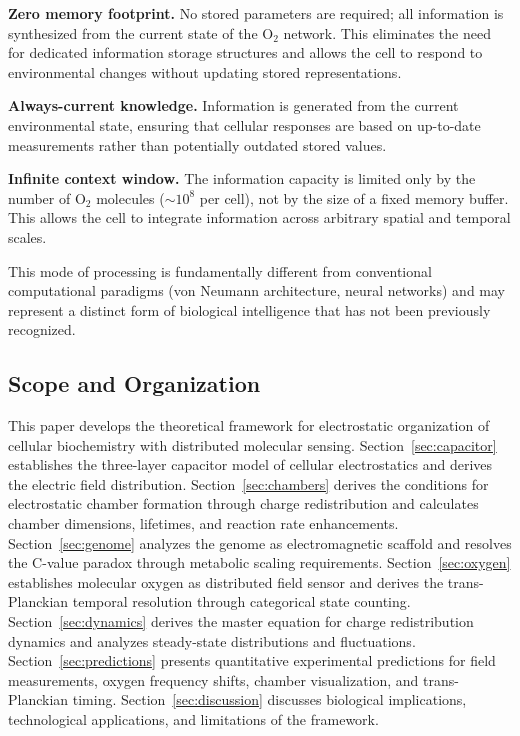 \documentclass[twocolumn,10pt,aps,prd,superscriptaddress,floatfix,nofootinbib]{revtex4-2}
\theoremstyle{remark}
\begin{document}
\textbf{Zero memory footprint.} No stored parameters are required; all information is synthesized from the current state of the O$_2$ network. This eliminates the need for dedicated information storage structures and allows the cell to respond to environmental changes without updating stored representations.

\textbf{Always-current knowledge.} Information is generated from the current environmental state, ensuring that cellular responses are based on up-to-date measurements rather than potentially outdated stored values.

\textbf{Infinite context window.} The information capacity is limited only by the number of O$_2$ molecules ($\sim 10^{8}$ per cell), not by the size of a fixed memory buffer. This allows the cell to integrate information across arbitrary spatial and temporal scales.

This mode of processing is fundamentally different from conventional computational paradigms (von Neumann architecture, neural networks) and may represent a distinct form of biological intelligence that has not been previously recognized.

\subsection{Scope and Organization}

This paper develops the theoretical framework for electrostatic organization of cellular biochemistry with distributed molecular sensing. Section~\ref{sec:capacitor} establishes the three-layer capacitor model of cellular electrostatics and derives the electric field distribution. Section~\ref{sec:chambers} derives the conditions for electrostatic chamber formation through charge redistribution and calculates chamber dimensions, lifetimes, and reaction rate enhancements. Section~\ref{sec:genome} analyzes the genome as electromagnetic scaffold and resolves the C-value paradox through metabolic scaling requirements. Section~\ref{sec:oxygen} establishes molecular oxygen as distributed field sensor and derives the trans-Planckian temporal resolution through categorical state counting. Section~\ref{sec:dynamics} derives the master equation for charge redistribution dynamics and analyzes steady-state distributions and fluctuations. Section~\ref{sec:predictions} presents quantitative experimental predictions for field measurements, oxygen frequency shifts, chamber visualization, and trans-Planckian timing. Section~\ref{sec:discussion} discusses biological implications, technological applications, and limitations of the framework.
\end{document}
